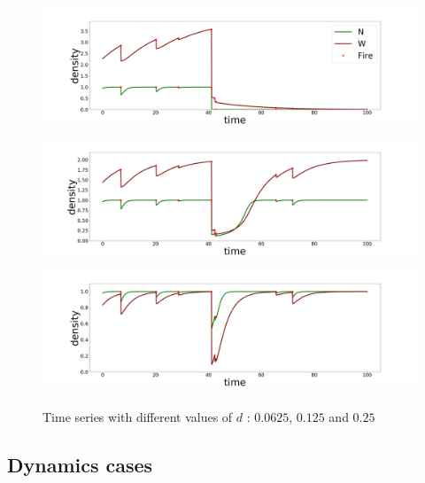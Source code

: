 \documentclass{article}
\begin{document}
\begin{figure}[h!]
\begin{center}
\includegraphics[height = 3.8cm]{results/time_series_2.png}
\includegraphics[height = 3.8cm]{results/time_series_3.png}
\includegraphics[height = 3.8cm]{results/time_series_4.png}
\end{center}
\caption{\label{fig:temp}Time series with different values of $d$ : $0.0625$, $0.125$ and $0.25$}
\end{figure}



\newpage

\subsection{Dynamics cases}
\label{dyna_cases}
\end{document}
